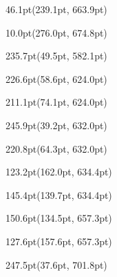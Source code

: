 \documentclass{article}
\begin{document}
\begin{textblock*}{46.1pt}(239.1pt, 663.9pt)%
\noindent%
%
\end{textblock*}
\begin{textblock*}{10.0pt}(276.0pt, 674.8pt)%
\noindent%
%
\end{textblock*}
\begin{textblock*}{235.7pt}(49.5pt, 582.1pt)%
\noindent%
%
\end{textblock*}
\begin{textblock*}{226.6pt}(58.6pt, 624.0pt)%
\noindent%
%
\end{textblock*}
\begin{textblock*}{211.1pt}(74.1pt, 624.0pt)%
\noindent%
%
\end{textblock*}
\begin{textblock*}{245.9pt}(39.2pt, 632.0pt)%
\noindent%
%
\end{textblock*}
\begin{textblock*}{220.8pt}(64.3pt, 632.0pt)%
\noindent%
%
\end{textblock*}
\begin{textblock*}{123.2pt}(162.0pt, 634.4pt)%
\noindent%
%
\end{textblock*}
\begin{textblock*}{145.4pt}(139.7pt, 634.4pt)%
\noindent%
%
\end{textblock*}
\begin{textblock*}{150.6pt}(134.5pt, 657.3pt)%
\noindent%
%
\end{textblock*}
\begin{textblock*}{127.6pt}(157.6pt, 657.3pt)%
\noindent%
%
\end{textblock*}
\begin{textblock*}{247.5pt}(37.6pt, 701.8pt)%
\noindent%
%
\end{textblock*}
\end{document}
